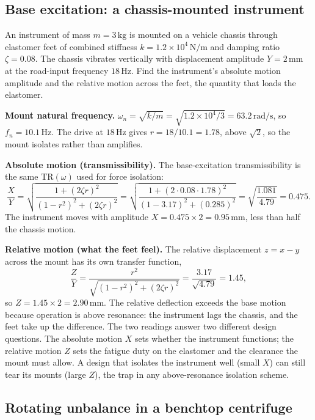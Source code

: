 \subsection{Base excitation: a chassis-mounted instrument}

An instrument of mass $m = 3\,\si{\kilogram}$ is mounted on a vehicle
chassis through elastomer feet of combined stiffness $k = 1.2\times
10^4\,\si{\newton\per\meter}$ and damping ratio $\zeta = 0.08$. The
chassis vibrates vertically with displacement amplitude $Y = 2\,\si{
\milli\meter}$ at the road-input frequency $18\,\si{\hertz}$. Find the
instrument's absolute motion amplitude and the relative motion across
the feet, the quantity that loads the elastomer.

\textbf{Mount natural frequency.} $\omega_n = \sqrt{k/m} = \sqrt{1.2
\times 10^4/3} = 63.2\,\si{\radian\per\second}$, so $f_n = 10.1\,\si{
\hertz}$. The drive at $18\,\si{\hertz}$ gives $r = 18/10.1 = 1.78$,
above $\sqrt2$, so the mount isolates rather than amplifies.

\textbf{Absolute motion (transmissibility).} The base-excitation
transmissibility is the same TR$(\omega)$ used for force isolation:
\[
\frac{X}{Y} = \sqrt{\frac{1 + (2\zeta r)^2}{(1 - r^2)^2 + (2\zeta
r)^2}} = \sqrt{\frac{1 + (2\cdot 0.08\cdot 1.78)^2}{(1 - 3.17)^2 +
(0.285)^2}} = \sqrt{\frac{1.081}{4.79}} = 0.475.
\]
The instrument moves with amplitude $X = 0.475 \times 2 = 0.95\,\si{
\milli\meter}$, less than half the chassis motion.

\textbf{Relative motion (what the feet feel).} The relative
displacement $z = x - y$ across the mount has its own transfer
function,
\[
\frac{Z}{Y} = \frac{r^2}{\sqrt{(1 - r^2)^2 + (2\zeta r)^2}} =
\frac{3.17}{\sqrt{4.79}} = 1.45,
\]
so $Z = 1.45 \times 2 = 2.90\,\si{\milli\meter}$. The relative
deflection exceeds the base motion because operation is above
resonance: the instrument lags the chassis, and the feet take up the
difference. The two readings answer two different design questions. The
absolute motion $X$ sets whether the instrument functions; the relative
motion $Z$ sets the fatigue duty on the elastomer and the clearance the
mount must allow. A design that isolates the instrument well (small $X$)
can still tear its mounts (large $Z$), the trap in any above-resonance
isolation scheme.

\subsection{Rotating unbalance in a benchtop centrifuge}

